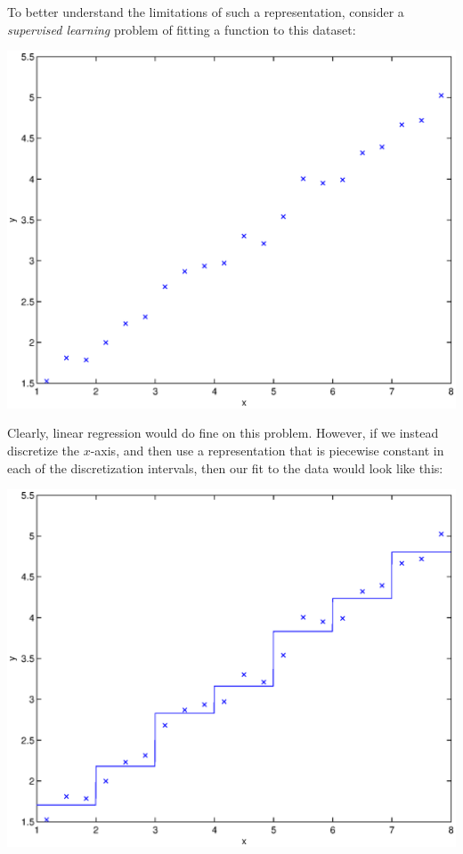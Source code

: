 \documentclass{article}
\begin{document}
To better understand the limitations of such a representation, consider
a \emph{supervised learning} problem of fitting
a function to this dataset:
\begin{center}
\includegraphics[scale=0.4]{linearData.eps}
\end{center}

Clearly, linear regression would do fine on this problem.  However, if we instead
discretize the $x$-axis, and then use a
representation that is piecewise constant in each
of the discretization intervals, then our fit to the data would look
like this:
\begin{center}
\includegraphics[scale=0.4]{staircase.eps}
\end{center}
\end{document}
